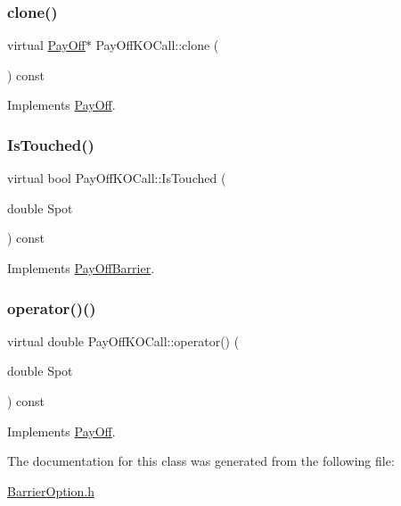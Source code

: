 \subsubsection{\texorpdfstring{clone()}{clone()}}
{\footnotesize\ttfamily virtual \hyperlink{classPayOff}{Pay\+Off}$\ast$ Pay\+Off\+K\+O\+Call\+::clone (\begin{DoxyParamCaption}{ }\end{DoxyParamCaption}) const\hspace{0.3cm}{\ttfamily [virtual]}}



Implements \hyperlink{classPayOff_ad8194d5b82247ae89c25c515f0ba806a}{Pay\+Off}.

\hypertarget{classPayOffKOCall_aa67fba615a4a0d6272bfc5f7c5604bd0}{}\label{classPayOffKOCall_aa67fba615a4a0d6272bfc5f7c5604bd0} 
\subsubsection{\texorpdfstring{Is\+Touched()}{IsTouched()}}
{\footnotesize\ttfamily virtual bool Pay\+Off\+K\+O\+Call\+::\+Is\+Touched (\begin{DoxyParamCaption}\item[{double}]{Spot }\end{DoxyParamCaption}) const\hspace{0.3cm}{\ttfamily [virtual]}}



Implements \hyperlink{classPayOffBarrier_a2aa9162c618c4f72a6593dc625e1e1e8}{Pay\+Off\+Barrier}.

\hypertarget{classPayOffKOCall_ae147980a5239924341f9f19ab8ac0ee1}{}\label{classPayOffKOCall_ae147980a5239924341f9f19ab8ac0ee1} 
\subsubsection{\texorpdfstring{operator()()}{operator()()}}
{\footnotesize\ttfamily virtual double Pay\+Off\+K\+O\+Call\+::operator() (\begin{DoxyParamCaption}\item[{double}]{Spot }\end{DoxyParamCaption}) const\hspace{0.3cm}{\ttfamily [virtual]}}



Implements \hyperlink{classPayOff_a5ae17d82c233ef5568c8fb0539703000}{Pay\+Off}.



The documentation for this class was generated from the following file\+:\begin{DoxyCompactItemize}
\item 
\hyperlink{BarrierOption_8h}{Barrier\+Option.\+h}\end{DoxyCompactItemize}
